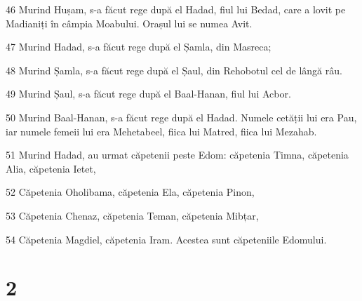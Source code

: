 \par 46 Murind Hușam, s-a făcut rege după el Hadad, fiul lui Bedad, care a lovit pe Madianiți în câmpia Moabului. Orașul lui se numea Avit.
\par 47 Murind Hadad, s-a făcut rege după el Șamla, din Masreca;
\par 48 Murind Șamla, s-a făcut rege după el Șaul, din Rehobotul cel de lângă râu.
\par 49 Murind Șaul, s-a făcut rege după el Baal-Hanan, fiul lui Acbor.
\par 50 Murind Baal-Hanan, s-a făcut rege după el Hadad. Numele cetății lui era Pau, iar numele femeii lui era Mehetabeel, fiica lui Matred, fiica lui Mezahab.
\par 51 Murind Hadad, au urmat căpetenii peste Edom: căpetenia Timna, căpetenia Alia, căpetenia Ietet,
\par 52 Căpetenia Oholibama, căpetenia Ela, căpetenia Pinon,
\par 53 Căpetenia Chenaz, căpetenia Teman, căpetenia Mibțar,
\par 54 Căpetenia Magdiel, căpetenia Iram. Acestea sunt căpeteniile Edomului.

\chapter{2}

